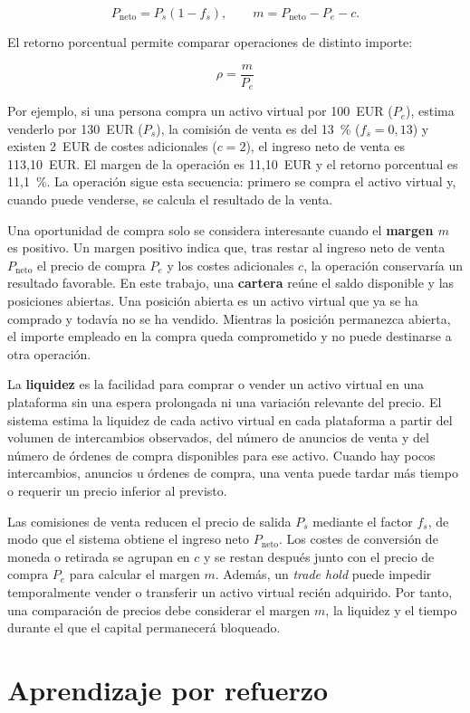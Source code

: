 \[
P_{\mathrm{neto}}=P_s(1-f_s),
\qquad
m=P_{\mathrm{neto}}-P_e-c.
\]

El retorno porcentual permite comparar operaciones de distinto importe:

\[
\rho=\frac{m}{P_e}
\]

Por ejemplo, si una persona compra un activo virtual por 100~EUR ($P_e$), estima venderlo por 130~EUR ($P_s$), la comisión de venta es del 13~\% ($f_s=0{,}13$) y existen 2~EUR de costes adicionales ($c=2$), el ingreso neto de venta es 113{,}10~EUR. El margen de la operación es 11{,}10~EUR y el retorno porcentual es 11,1~\%. La operación sigue esta secuencia: primero se compra el activo virtual y, cuando puede venderse, se calcula el resultado de la venta.

Una oportunidad de compra solo se considera interesante cuando el \textbf{margen $m$} es positivo. Un margen positivo indica que, tras restar al ingreso neto de venta $P_{\mathrm{neto}}$ el precio de compra $P_e$ y los costes adicionales $c$, la operación conservaría un resultado favorable. En este trabajo, una \textbf{cartera} reúne el saldo disponible y las posiciones abiertas. Una posición abierta es un activo virtual que ya se ha comprado y todavía no se ha vendido. Mientras la posición permanezca abierta, el importe empleado en la compra queda comprometido y no puede destinarse a otra operación.

La \textbf{liquidez} es la facilidad para comprar o vender un activo virtual en una plataforma sin una espera prolongada ni una variación relevante del precio. El sistema estima la liquidez de cada activo virtual en cada plataforma a partir del volumen de intercambios observados, del número de anuncios de venta y del número de órdenes de compra disponibles para ese activo. Cuando hay pocos intercambios, anuncios u órdenes de compra, una venta puede tardar más tiempo o requerir un precio inferior al previsto.

Las comisiones de venta reducen el precio de salida $P_s$ mediante el factor $f_s$, de modo que el sistema obtiene el ingreso neto $P_{\mathrm{neto}}$. Los costes de conversión de moneda o retirada se agrupan en $c$ y se restan después junto con el precio de compra $P_e$ para calcular el margen $m$. Además, un \textit{trade hold} puede impedir temporalmente vender o transferir un activo virtual recién adquirido. Por tanto, una comparación de precios debe considerar el margen $m$, la liquidez y el tiempo durante el que el capital permanecerá bloqueado.

\section{Aprendizaje por refuerzo}

